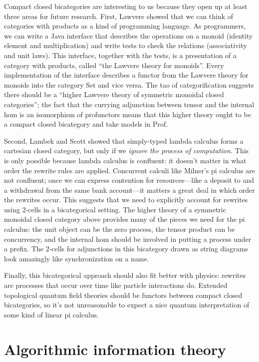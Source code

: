 \documentclass[12pt,twoside,openright]{report}
\begin{document}
Compact closed bicategories are interesting to us because they open up at least three areas for future research.  First, Lawvere showed that we can think of categories with products as a kind of programming language.  As programmers, we can write a Java interface that describes the operations on a monoid (identity element and multiplication) and write tests to check the relations (associativity and unit laws).  This interface, together with the tests, is a presentation of a category with products, called ``the Lawvere theory for monoids''.  Every implementation of the interface describes a functor from the Lawvere theory for monoids into the category Set and vice versa.  The tao of categorification suggests there should be a ``higher Lawvere theory of symmetric monoidal closed categories''; the fact that the currying adjunction between tensor and the internal hom is an isomorphism of profunctors means that this higher theory ought to be a compact closed bicategory and take models in Prof.

Second, Lambek and Scott showed that simply-typed lambda calculus forms a cartesian closed category, but only if we {\em ignore the process of computation.}  This is only possible because lambda calculus is confluent: it doesn't matter in what order the rewrite rules are applied.  Concurrent calculi like Milner's pi calculus are not confluent; once we can express contention for resources---like a deposit to and a withdrawal from the same bank account---it matters a great deal in which order the rewrites occur.  This suggests that we need to explicitly account for rewrites using 2-cells in a bicategorical setting.  The higher theory of a symmetric monoidal closed category above provides many of the pieces we need for the pi calculus: the unit object can be the zero process, the tensor product can be concurrency, and the internal hom should be involved in putting a process under a prefix.  The 2-cells for adjunctions in this bicategory drawn as string diagrams look amazingly like synchronization on a name.

Finally, this bicategorical approach should also fit better with physics: rewrites are processes that occur over time like particle interactions do.  Extended topological quantum field theories should be functors between compact closed bicategories, so it's not unreasonable to expect a nice quantum interpretation of some kind of linear pi calculus.

\setcounter{chapter}{0}
\part{Algorithmic information theory}
\end{document}
